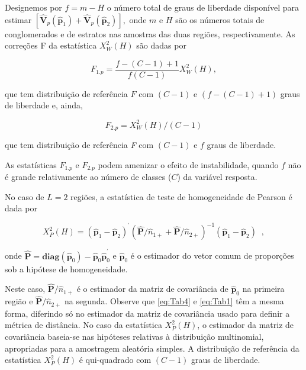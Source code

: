 \documentclass[]{book}
\numberwithin{example}{chapter}
\numberwithin{remark}{chapter}
\numberwithin{definition}{chapter}
\begin{document}
Designemos por \(f=m-H\) o número total de graus de liberdade disponível
para estimar
\(\left[ \mathbf{\hat{V}}_{p}\left( \widehat{ \mathbf{p}}_{1}\right) +\mathbf{\hat{V}}_{p}\left( \widehat{\mathbf{p}} _{2}\right) \right] ,\)
onde \(m\) e \(H\) são os números totais de conglomerados e de estratos
nas amostras das duas regiões, respectivamente. As correções F da
estatística \(X_{W}^{2}\left( H\right)\) são dadas por

\begin{equation}
F_{1.p}=\frac{f-\left( C-1\right) +1}{f\left( C-1\right) }X_{W}^{2}\left(
H\right) , \label{eq:Tab2} 
\end{equation}

que tem distribuição de referência \(F\) com \(\left(C-1\right)\) e
\(\left( f-\left( C-1\right)+1\right)\) graus de liberdade e, ainda,

\begin{equation}
F_{2.p}=X_{W}^{2}\left( H\right) /\left(C-1\right) \label{eq:Tab3}
\end{equation}

que tem distribuição de referência \emph{F} com \(\left(C-1\right)\) e
\(f\) graus de liberdade.

As estatísticas \(F_{1.p}\) e \(F_{2.p}\) podem amenizar o efeito de
instabilidade, quando \(f\) não é grande relativamente ao número de
classes (\(C\)) da variável resposta.

No caso de \(L=2\) regiões, a estatística de teste de homogeneidade de
Pearson é dada por

\begin{equation}
X_{P}^{2}\left( H\right) =\left( \mathbf{\hat{p}}_{1}-\mathbf{\hat{p}}
_{2}\right) ^{^{\prime }}\left( \mathbf{\hat{P}}/\widehat{n}_{1+}+\mathbf{
\hat{P}}/\widehat{n}_{2+}\right) ^{-1}\left( \mathbf{\hat{p}}_{1}-\mathbf{
\hat{p}}_{2}\right) \;\;,  \label{eq:Tab4}
\end{equation}

onde
\(\mathbf{\hat{P}=diag}\left( \mathbf{\hat{p}}_{0}\right) -\mathbf{\hat{p }}_{0}\mathbf{\hat{p}}_{0}^{^{\prime }}\)
e \(\mathbf{\hat{p}}_{0}\) é o estimador do vetor comum de proporções
sob a hipótese de homogeneidade.

Neste caso, \(\mathbf{\hat{P}}/\widehat{n}_{1+}\) é o estimador da
matriz de covariância de \(\mathbf{\hat{p}}_{0}\) na primeira região e
\(\mathbf{\hat{P}}/\widehat{n}_{2+}\) na segunda. Observe que
\eqref{eq:Tab4} e \eqref{eq:Tab1} têm a mesma forma, diferindo só no
estimador da matriz de covariância usado para definir a métrica de
distância. No caso da estatística \(X_{P}^{2}\left( H\right)\), o
estimador da matriz de covariância baseia-se nas hipóteses relativas à
distribuição multinomial, apropriadas para a amostragem aleatória
simples. A distribuição de referência da estatística
\(X_{P}^{2}\left( H\right)\) é qui-quadrado com \(\left( C-1\right)\)
graus de liberdade.
\end{document}

